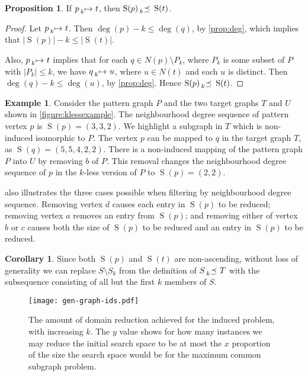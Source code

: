 \documentclass[letterpaper]{article}
\theoremstyle{definition}
\newtheorem{corollary}{Corollary}
\newtheorem{example}{Example}
\newtheorem{proposition}{Proposition}
\newcommand{\lessmap}[1]{\prescript{}{#1}{\mapsto}\ }
\newcommand{\lesspreceq}[1]{\prescript{}{#1}{\preceq}\ }
\newcommand{\nds}{\operatorname{S}}
\begin{document}
\begin{proposition}\label{prop:nds}
If $p \lessmap{k} t$, then $\nds(p) \lesspreceq{k} \nds(t)$.
\end{proposition}
\begin{proof}
Let $p \lessmap{k} t$.  Then $\deg(p) - k \leq \deg(q)$, by \cref{prop:deg}, which
implies that $\left|\nds(p)\right| -k \leq \left| \nds(t) \right| $.

Also, $p \lessmap{k} t$ implies that for each $q \in N(p) \setminus P_k$, where $P_k$
is some subset of $P$ with $\left| P_k \right| \leq k$, we have $q \lessmap{k} u$, where $u \in N(t)$ and
each $u$ is distinct.  Then $\deg(q) - k \leq \deg(u)$, by \cref{prop:deg}.  Hence $\nds(p)
\lesspreceq{k} \nds(t)$.
\end{proof}

\begin{example}
Consider the pattern graph $P$ and the two target graphs $T$ and $U$ shown in
\cref{figure:klessexample}. The neighbourhood degree sequence of pattern vertex $p$ is
$\nds(p)=(3,3,2)$.
We highlight a subgraph in $T$ which is non-induced isomorphic to $P$. The vertex $p$ can be
mapped to $q$ in the target graph $T$, as $\nds(q)=(5,5,4,2,2)$.  There is a non-induced
mapping of the pattern graph $P$ into $U$ by removing $b$ of $P$.  This removal
changes the neighbourhood degree sequence of $p$ in the $k$-less version of $P$ to $\nds(p)=(2,2)$.
\end{example}

 also illustrates the three cases possible when filtering by neighbourhood
degree sequence.  Removing vertex $d$ causes each entry in $\nds(p)$ to be reduced; removing vertex
$a$ removes an entry from $\nds(p)$; and removing either of vertex $b$ or $c$ causes both the size
of $\nds(p)$ to be reduced and an entry in $\nds(p)$ to be reduced.

\begin{corollary}
Since both $\nds(p)$ and $\nds(t)$ are non-ascending, without loss of generality we can replace
$S \setminus S_k$ from the definition of $S \lesspreceq{k} T$ with the subsequence consisting of all
    but the first $k$ members of $S$.
\end{corollary}

\begin{figure}
    \centering
    \texttt{[image: gen-graph-ids.pdf]}
    \caption{The amount of domain reduction achieved for the induced problem, with increasing
    $k$. The $y$ value shows for how many instances we may reduce the initial search space to be
    at most the $x$ proportion of the size the search space would be for the maximum common subgraph
    problem.}\label{figure:ids}
\end{figure}
\end{document}
